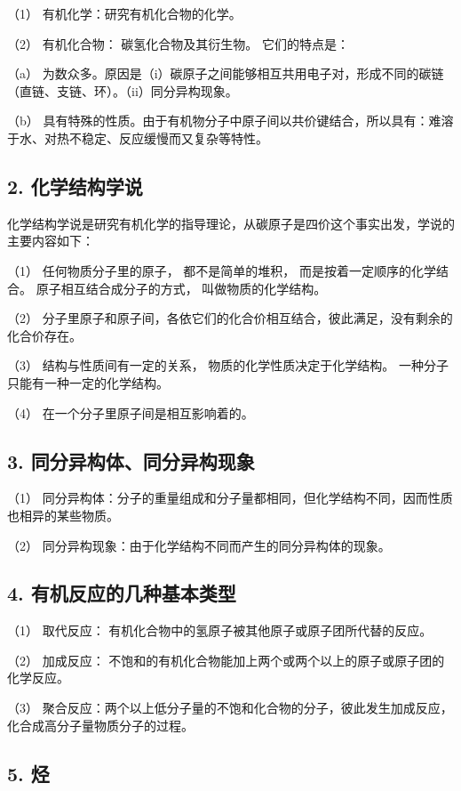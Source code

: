 （1） 有机化学：研究有机化合物的化学。

（2） 有机化合物： 碳氢化合物及其衍生物。 它们的特点是：

（a）
为数众多。原因是（i）碳原子之间能够相互共用电子对，形成不同的碳链（直链、支链、环）。（ii）同分异构现象。

（b）
具有特殊的性质。由于有机物分子中原子间以共价键结合，所以具有：难溶于水、对热不稳定、反应缓慢而又复杂等特性。

\subsection{2. 化学结构学说}

化学结构学说是研究有机化学的指导理论，从碳原子是四价这个事实出发，学说的主要内容如下：

（1） 任何物质分子里的原子， 都不是简单的堆积，
而是按着一定顺序的化学结合。 原子相互结合成分子的方式，
叫做物质的化学结构。

（2）
分子里原子和原子间，各依它们的化合价相互结合，彼此满足，没有剩余的化合价存在。

（3） 结构与性质间有一定的关系， 物质的化学性质决定于化学结构。
一种分子只能有一种一定的化学结构。

（4） 在一个分子里原子间是相互影响着的。

\subsection{3. 同分异构体、同分异构现象}

（1）
同分异构体：分子的重量组成和分子量都相同，但化学结构不同，因而性质也相异的某些物质。

（2） 同分异构现象：由于化学结构不同而产生的同分异构体的现象。

\subsection{4. 有机反应的几种基本类型}

（1） 取代反应： 有机化合物中的氢原子被其他原子或原子团所代替的反应。

（2） 加成反应：
不饱和的有机化合物能加上两个或两个以上的原子或原子团的化学反应。

（3）
聚合反应：两个以上低分子量的不饱和化合物的分子，彼此发生加成反应，化合成高分子量物质分子的过程。

\subsection{5. 烃}

